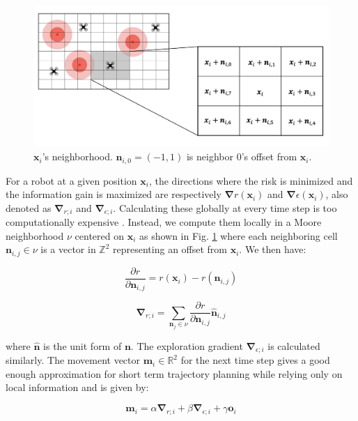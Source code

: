 \documentclass[letterpaper, 10 pt, conference]{ieeeconf}
\begin{document}
\begin{figure}[h]
	\centering
    \includegraphics[width=0.95\columnwidth]{images/Moore.png}
    \caption{$\bm{x}_i$'s neighborhood. $\bm{n}_{i,0} = (-1, 1)$ is neighbor 0's offset from $\bm{x}_i$.}
    \label{neighborhood}
\end{figure}

For a robot at a given position $\bm{x}_i$, the directions where the
risk is minimized and the information gain is maximized are
respectively $\bm{\nabla}r(\bm{x}_i)$ and
$\bm{\nabla}\epsilon(\bm{x}_i)$, also denoted as $\bm{\nabla}_{r;i}$
and $\bm{\nabla}_{\epsilon;i}$. Calculating these globally at every
time step is too computationally expensive
\cite{dames2012decentralized,schwagerMultirobotControlPolicy2017}. Instead,
we compute them locally in a Moore neighborhood $\nu$ centered on
$\bm{x}_i$ as shown in Fig. \ref{neighborhood} where each neighboring
cell $\bm{n}_{i,j} \in \nu$ is a vector in $\mathbb{Z}^2$ representing
an offset from $\bm{x}_i$. We then have:

\begin{equation}
    \frac{\partial r}{\partial \bm{n}_{i,j}} = r(\bm{x}_i) - r(\bm{n}_{i,j})
    \label{eq:neighbor}
\end{equation}

\begin{equation}
    \bm{\nabla}_{r;i} = \sum_{\bm{n}_j \in \nu}\frac{\partial r}{\partial \bm{n}_{i,j}} \bm{\hat{n}}_{i,j}
    \label{eq:gradient}
\end{equation}

where $\bm{\hat{n}}$ is the unit form of $\bm{n}$. The exploration
gradient $\bm{\nabla}_{\epsilon;i}$ is calculated similarly. The
movement vector $\bm{m}_i \in \mathbb{R}^2$ for the next time step
gives a good enough approximation for short term trajectory planning
while relying only on local information and is given by:

\begin{equation}
    \bm{m}_i = \alpha\bm{\nabla}_{r;i} + \beta\bm{\nabla}_{\epsilon;i} + \gamma\bm{o}_i
    \label{eq:movement}
\end{equation}
\end{document}

